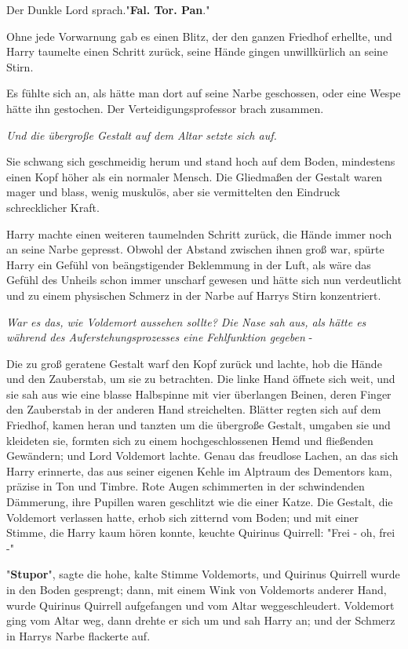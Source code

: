 {Der Dunkle Lord sprach."\textbf{Fal. Tor. Pan}."

Ohne jede Vorwarnung gab es einen Blitz, der den ganzen Friedhof erhellte, und Harry taumelte einen Schritt zurück, seine Hände gingen unwillkürlich an seine Stirn.

Es fühlte sich an, als hätte man dort auf seine Narbe geschossen, oder eine Wespe hätte ihn gestochen. Der Verteidigungsprofessor brach zusammen.

\emph{Und die übergroße Gestalt auf dem Altar setzte sich auf.}

Sie schwang sich geschmeidig herum und stand hoch auf dem Boden, mindestens einen Kopf höher als ein normaler Mensch. Die Gliedmaßen der Gestalt waren mager und blass, wenig muskulös, aber sie vermittelten den Eindruck schrecklicher Kraft.

Harry machte einen weiteren taumelnden Schritt zurück, die Hände immer noch an seine Narbe gepresst. Obwohl der Abstand zwischen ihnen groß war, spürte Harry ein Gefühl von beängstigender Beklemmung in der Luft, als wäre das Gefühl des Unheils schon immer unscharf gewesen und hätte sich nun verdeutlicht und zu einem physischen Schmerz in der Narbe auf Harrys Stirn konzentriert.

\emph{War es das, wie Voldemort aussehen sollte? Die Nase sah aus, als hätte es während des Auferstehungsprozesses eine Fehlfunktion gegeben} -

Die zu groß geratene Gestalt warf den Kopf zurück und lachte, hob die Hände und den Zauberstab, um sie zu betrachten. Die linke Hand öffnete sich weit, und sie sah aus wie eine blasse Halbspinne mit vier überlangen Beinen, deren Finger den Zauberstab in der anderen Hand streichelten. Blätter regten sich auf dem Friedhof, kamen heran und tanzten um die übergroße Gestalt, umgaben sie und kleideten sie, formten sich zu einem hochgeschlossenen Hemd und fließenden Gewändern; und Lord Voldemort lachte. Genau das freudlose Lachen, an das sich Harry erinnerte, das aus seiner eigenen Kehle im Alptraum des Dementors kam, präzise in Ton und Timbre. Rote Augen schimmerten in der schwindenden Dämmerung, ihre Pupillen waren geschlitzt wie die einer Katze. Die Gestalt, die Voldemort verlassen hatte, erhob sich zitternd vom Boden; und mit einer Stimme, die Harry kaum hören konnte, keuchte Quirinus Quirrell: "Frei - oh, frei -"

"\textbf{Stupor}", sagte die hohe, kalte Stimme Voldemorts, und Quirinus Quirrell wurde in den Boden gesprengt; dann, mit einem Wink von Voldemorts anderer Hand, wurde Quirinus Quirrell aufgefangen und vom Altar weggeschleudert. Voldemort ging vom Altar weg, dann drehte er sich um und sah Harry an; und der Schmerz in Harrys Narbe flackerte auf.

}
